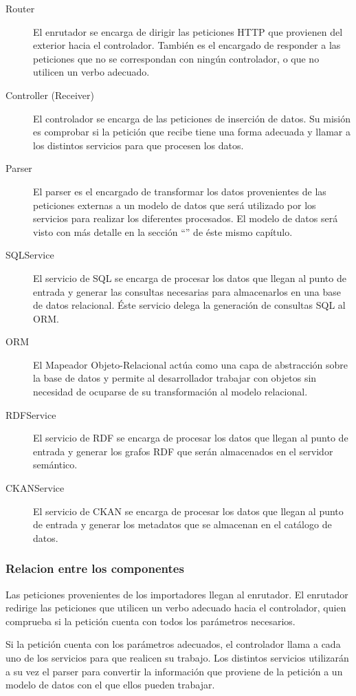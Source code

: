\begin{description}
	\item[Router]  El enrutador se encarga de dirigir las peticiones HTTP que provienen del exterior hacia el controlador.  También es el encargado de responder a las peticiones que no se correspondan con ningún controlador, o que no utilicen un verbo adecuado.
	\item[Controller (Receiver)]  El controlador se encarga de las peticiones de inserción de datos.  Su misión es comprobar si la petición que recibe tiene una forma adecuada y llamar a los distintos servicios para que procesen los datos.
	\item[Parser]  El parser es el encargado de transformar los datos provenientes de las peticiones externas a un modelo de datos que será utilizado por los servicios para realizar los diferentes procesados.  El modelo de datos será visto con más detalle en la sección ``'' de éste mismo capítulo.
	\item[SQLService]  El servicio de SQL se encarga de procesar los datos que llegan al punto de entrada y generar las consultas necesarias para almacenarlos en una base de datos relacional.  Éste servicio delega la generación de consultas SQL al ORM.
	\item[ORM]  El Mapeador Objeto-Relacional actúa como una capa de abstracción sobre la base de datos y permite al desarrollador trabajar con objetos sin necesidad de ocuparse de su transformación al modelo relacional.
	\item[RDFService]  El servicio de RDF se encarga de procesar los datos que llegan al punto de entrada y generar los grafos RDF que serán almacenados en el servidor semántico.
	\item[CKANService]  El servicio de CKAN se encarga de procesar los datos que llegan al punto de entrada y generar los metadatos que se almacenan en el catálogo de datos.
\end{description}


\subsubsection{Relacion entre los componentes}
Las peticiones provenientes de los importadores llegan al enrutador.  El enrutador redirige las peticiones que utilicen un verbo adecuado hacia el controlador, quien comprueba si la petición cuenta con todos los parámetros necesarios.

Si la petición cuenta con los parámetros adecuados, el controlador llama a cada uno de los servicios para que realicen su trabajo.  Los distintos servicios utilizarán a su vez el parser para convertir la información que proviene de la petición a un modelo de datos con el que ellos pueden trabajar.


